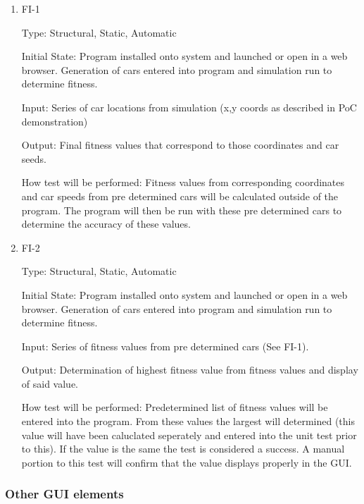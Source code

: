 \documentclass[12pt, titlepage]{article}
\begin{document}
\begin{enumerate}

\item{FI-1\\}

Type: Structural, Static, Automatic
					
Initial State: Program installed onto system and launched or open in a web browser. Generation of cars entered into program and simulation run to determine fitness.
					
Input: Series of car locations from simulation (x,y coords as described in PoC demonstration)
					
Output: Final fitness values that correspond to those coordinates and car seeds.
					
How test will be performed: Fitness values from corresponding coordinates and car speeds from pre determined cars will be calculated outside of the program. The program will then be run with these pre determined cars to determine the accuracy of these values. 
					
\item{FI-2\\}

Type: Structural, Static, Automatic
					
Initial State: Program installed onto system and launched or open in a web browser. Generation of cars entered into program and simulation run to determine fitness.
					
Input: Series of fitness values from pre determined cars (See FI-1).
					
Output: Determination of highest fitness value from fitness values and display of said value.
					
How test will be performed:  Predetermined list of fitness values will be entered into the program. From these values the largest will determined (this value will have been caluclated seperately and entered into the unit test prior to this). If the value is the same the test is considered a success. A manual portion to this test will confirm that the value displays properly in the GUI.

\end{enumerate}

\subsubsection{Other GUI elements}
\end{document}
